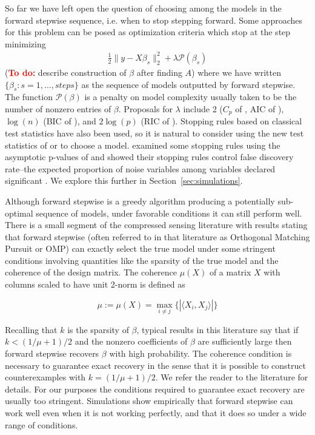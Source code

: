\documentclass{imsart}
\newcommand{\todo}{\textcolor{red}{\textbf{To do: }}}
\newcommand{\innerp}[2]{\langle #1 , #2 \rangle}
\newcommand{\pen}{\mathcal{P}}
\begin{document}
So far we have left open the question of choosing among the models in
the forward stepwise sequence, i.e. when to stop stepping
forward. Some approaches for this problem can be posed as optimization
criteria which stop at the step minimizing
\begin{equation}
\begin{aligned}
\label{eq:subsetregress}
\frac{1}{2} \| y - X \beta_s \|_2^2 + \lambda \pen(\beta_s)
\end{aligned}
\end{equation}
(\todo describe construction of $\beta$ after finding $A$)
where we have written $\{ \beta_s : s = 1, \ldots, steps \}$ as
the sequence of models outputted by forward stepwise. The function
$\pen(\beta)$ is a penalty on model complexity usually taken to be the
number of nonzero entries of $\beta$. Proposals for $\lambda$ include
2 ($C_p$ of \cite{CP}, AIC of \cite{AIC}), $\log(n)$ (BIC of \cite{BIC}), and
$2\log(p)$ (RIC of \cite{RIC}). Stopping rules based on classical test
statistics have also been used, so it is natural to consider using
the new test statistics of \cite{significance:lasso} or
\cite{tests:adaptive}
to choose a model. \cite{sequential:fdr} examined some stopping rules
using the asymptotic p-values of \cite{significance:lasso} and showed
their stopping rules control false discovery rate--the expected
proportion of noise variables among variables declared significant
\citep{fdr}. We explore this further in Section~\ref{sec:simulations}.

Although forward stepwise is a greedy algorithm producing a
potentially sub-optimal sequence of models, under favorable conditions
it can still perform well. There is a small segment of the
compressed sensing literature \citep{donoho:pursuit, cai:wang:omp}
with results stating that forward stepwise (often referred to in that
literature as Orthogonal Matching Pursuit or OMP) can exactly select
the true model
under some stringent conditions involving quantities like the sparsity
of the true model and the coherence of the design matrix. The
coherence $\mu(X)$ of a matrix $X$ with columns scaled to have unit
2-norm is defined as

\begin{equation}
  \mu := \mu(X) = \max_{i \neq j} \{ | \innerp{ X_i }{ X_j } | \}
\end{equation}

Recalling that $k$ is the sparsity of $\beta$, typical results in this
literature say that if $k < (1/\mu + 1)/2$ and the nonzero
coefficients of $\beta$ are sufficiently large then forward stepwise
recovers $\beta$ with high probability. The coherence condition is
necessary to guarantee exact recovery \citep{cai:wang:xu:sharp} in the
sense that it is possible to construct counterexamples with
$k = (1/\mu + 1)/2$. We refer the reader to the literature for details.
For our purposes the
conditions required to guarantee exact recovery are usually too
stringent. Simulations show empirically that forward
stepwise can work well even when it is not working perfectly, and that
it does so under a wide range of conditions.
\end{document}
